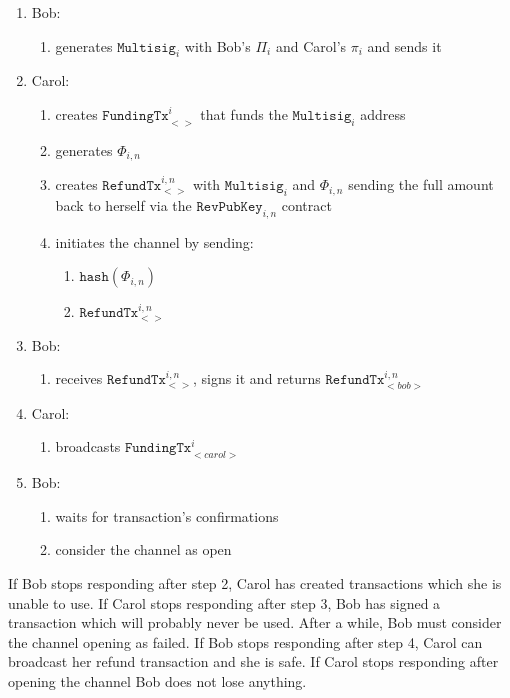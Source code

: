 \documentclass{llncs}
\begin{document}
\begin{enumerate}
\item Bob:
  \begin{enumerate}
  \item generates $\texttt{Multisig}_{i}$ with Bob's $\Pi_{i}$ and Carol's
$\pi_{i}$ and sends it
  \end{enumerate}
\item Carol:
  \begin{enumerate}
  \item creates $\texttt{FundingTx}_{<>}^{i}$ that funds the
$\texttt{Multisig}_{i}$ address
  \item generates $\Phi_{i,n}$
  \item creates $\texttt{RefundTx}_{<>}^{i,n}$ with $\texttt{Multisig}_{i}$ and
$\Phi_{i,n}$ sending the full amount back to herself via the
$\texttt{RevPubKey}_{i,n}$ contract
  \item initiates the channel by sending:
    \begin{enumerate}
    \item $\texttt{hash}(\Phi_{i,n})$
    \item $\texttt{RefundTx}_{<>}^{i,n}$
    \end{enumerate}
  \end{enumerate}
\item Bob:
  \begin{enumerate}
  \item receives $\texttt{RefundTx}_{<>}^{i,n}$, signs it and returns
$\texttt{RefundTx}_{<bob>}^{i,n}$
  \end{enumerate}
\item Carol:
  \begin{enumerate}
  \item broadcasts $\texttt{FundingTx}_{<carol>}^{i}$
  \end{enumerate}
\item Bob:
  \begin{enumerate}
  \item waits for transaction's confirmations
  \item consider the channel as open
  \end{enumerate}
\end{enumerate}

If Bob stops responding after step 2, Carol has created transactions which she
is unable to use. If Carol stops responding after step 3, Bob has signed a
transaction which will probably never be used. After a while, Bob must consider
the channel opening as failed. If Bob stops responding after step 4, Carol can
broadcast her refund transaction and she is safe. If Carol stops responding
after opening the channel Bob does not lose anything.
\end{document}
